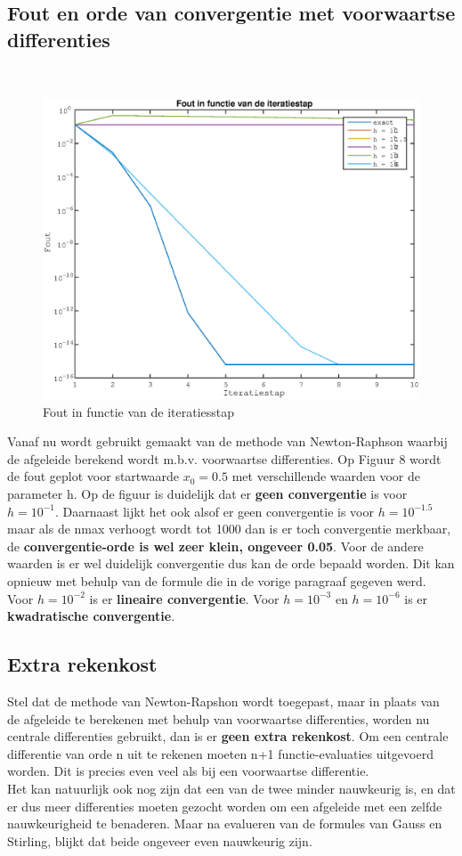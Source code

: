 \documentclass{article}
\begin{document}
\subsection{Fout en orde van convergentie met voorwaartse differenties}
\ \\
\begin{figure}[H]
\includegraphics[width=0.75\columnwidth]{figuur_4}
\caption{Fout in functie van de iteratiesstap} %
\end{figure}

Vanaf nu wordt gebruikt gemaakt van de methode van Newton-Raphson waarbij de afgeleide berekend wordt m.b.v. voorwaartse differenties. Op Figuur 8 wordt de fout geplot voor startwaarde $x_{0}=0.5$ met verschillende waarden voor de parameter h. Op de figuur is duidelijk dat er \textbf{geen convergentie} is voor $h=10^{-1}$. Daarnaast lijkt het ook alsof er geen convergentie is voor $h=10^{-1.5}$ maar als de nmax verhoogt wordt tot 1000 dan is er toch convergentie merkbaar, de \textbf{convergentie-orde is wel zeer klein, ongeveer 0.05}.  Voor de andere waarden is er wel duidelijk convergentie dus kan de orde bepaald worden. Dit kan opnieuw met behulp van de formule die in de vorige paragraaf gegeven werd. Voor $h=10^{-2}$ is er \textbf{lineaire convergentie}. Voor $h=10^{-3}$ en $h=10^{-6}$ is er \textbf{kwadratische convergentie}.

\subsection{Extra rekenkost}
Stel dat de methode van Newton-Rapshon wordt toegepast, maar in plaats van de afgeleide te berekenen met behulp van voorwaartse differenties, worden nu centrale differenties gebruikt, dan is er \textbf{geen extra rekenkost}. Om een centrale differentie van orde n uit te rekenen moeten n+1 functie-evaluaties uitgevoerd worden. Dit is precies even veel als bij een voorwaartse differentie. \\
Het kan natuurlijk ook nog zijn dat een van de twee minder nauwkeurig is, en dat er dus meer differenties moeten gezocht worden om een afgeleide met een zelfde nauwkeurigheid te benaderen. Maar na evalueren van de formules van Gauss en Stirling, blijkt dat beide ongeveer even nauwkeurig zijn.




\clearpage

\end{document}
